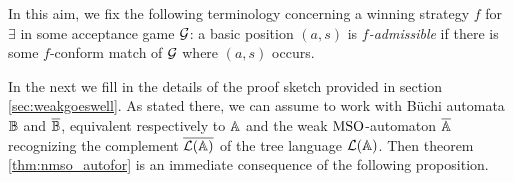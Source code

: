 In this aim, we fix the following terminology concerning a winning strategy $f$ for $\exists$ in some acceptance game $\mathcal{G}$: a basic position $(a,s)$ is \emph{$f$-admissible} if there is some $f$-conform match of $\mathcal{G}$ where $(a,s)$ occurs. %

In the next we fill in the details of the proof sketch provided in section \ref{sec:weakgoeswell}. As stated there, we can assume to work with B\"{u}chi automata $\mathbb{B}$ and $\overline{\mathbb{B}}$, equivalent respectively to $\mathbb{A}$ and the weak $\mathrm{MSO}$-automaton $\overline{\mathbb{A}}$ recognizing the complement $\overline{\mathcal{L}(\mathbb{A})}$ of the tree language $\mathcal{L}(\mathbb{A})$. Then theorem \ref{thm:nmso_autofor} is an immediate consequence of the following proposition.

